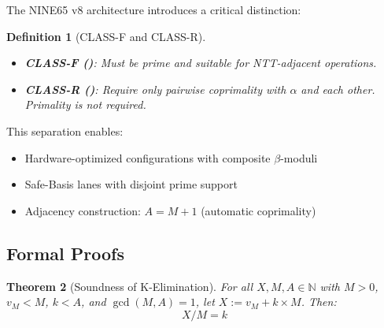 \documentclass[11pt,letterpaper]{article}
\newtheorem{theorem}{Theorem}[section]
\newtheorem{definition}[theorem]{Definition}
\newcommand{\N}{\mathbb{N}}
\begin{document}
The NINE65 v8 architecture introduces a critical distinction:

\begin{definition}[CLASS-F and CLASS-R]
\label{def:class-f-r}
\begin{itemize}
\item {\bf CLASS-F (\alpha{})}: Must be prime and suitable for NTT-adjacent operations.
\item {\bf CLASS-R (\beta{})}: Require only pairwise coprimality with \(\alpha\) and each other. Primality is {\em not} required.
\end{itemize}
\end{definition}

This separation enables:

\begin{itemize}
\item Hardware-optimized configurations with composite \(\beta\)-moduli
\item Safe-Basis lanes with disjoint prime support
\item Adjacency construction: \(A = M + 1\) (automatic coprimality)
\end{itemize}

\newpage

\subsection{Formal Proofs}

\begin{theorem}[Soundness of K-Elimination]
\label{thm:soundness}
For all \(X, M, A \in \N\) with \(M > 0\), \(v_M < M\), \(k < A\), and \(\gcd(M, A) = 1\), let \(X := v_M + k \times M\). Then:
\begin{equation*}
X / M = k
\end{equation*}
\end{theorem}
\end{document}
